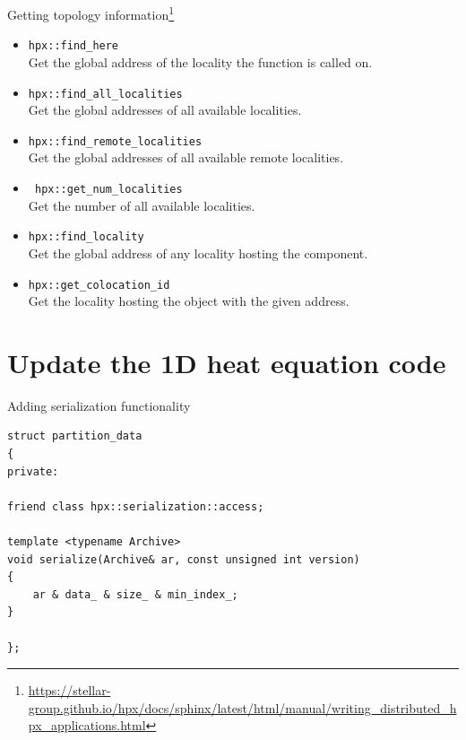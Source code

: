 \documentclass[\classoption]{beamer}
\begin{document}
\begin{frame}{Getting topology information\footnote{\tiny\url{https://stellar-group.github.io/hpx/docs/sphinx/latest/html/manual/writing_distributed_hpx_applications.html}}}

\begin{itemize}
\item \lstinline|hpx::find_here| \\
Get the global address of the locality the function is called on.

\item \lstinline|hpx::find_all_localities| \\
Get the global addresses of all available localities.

\item \lstinline|hpx::find_remote_localities| \\
Get the global addresses of all available remote localities.

\item \lstinline| hpx::get_num_localities| \\
Get the number of all available localities.

\item \lstinline|hpx::find_locality| \\
Get the global address of any locality hosting the component.

\item \lstinline|hpx::get_colocation_id| \\
Get the locality hosting the object with the given address.
\end{itemize}

\end{frame}

\section{Update the 1D heat equation code}


\begin{frame}[fragile]{Adding serialization functionality}

\begin{lstlisting}
struct partition_data
{
private:
 
friend class hpx::serialization::access;

template <typename Archive>
void serialize(Archive& ar, const unsigned int version)
{
    ar & data_ & size_ & min_index_;
}

};
\end{lstlisting}


\end{frame}
\end{document}

